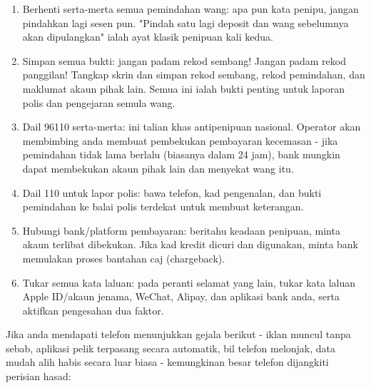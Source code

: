 \begin{enumerate}
  \item Berhenti serta-merta semua pemindahan wang: apa pun kata penipu, jangan pindahkan lagi sesen pun. "Pindah satu lagi deposit dan wang sebelumnya akan dipulangkan" ialah ayat klasik penipuan kali kedua.
  \item Simpan semua bukti: jangan padam rekod sembang! Jangan padam rekod panggilan! Tangkap skrin dan simpan rekod sembang, rekod pemindahan, dan maklumat akaun pihak lain. Semua ini ialah bukti penting untuk laporan polis dan pengejaran semula wang.
  \item Dail 96110 serta-merta: ini talian khas antipenipuan nasional. Operator akan membimbing anda membuat pembekukan pembayaran kecemasan - jika pemindahan tidak lama berlalu (biasanya dalam 24 jam), bank mungkin dapat membekukan akaun pihak lain dan menyekat wang itu.
  \item Dail 110 untuk lapor polis: bawa telefon, kad pengenalan, dan bukti pemindahan ke balai polis terdekat untuk membuat keterangan.
  \item Hubungi bank/platform pembayaran: beritahu keadaan penipuan, minta akaun terlibat dibekukan. Jika kad kredit dicuri dan digunakan, minta bank memulakan proses bantahan caj (chargeback).
  \item Tukar semua kata laluan: pada peranti selamat yang lain, tukar kata laluan Apple ID/akaun jenama, WeChat, Alipay, dan aplikasi bank anda, serta aktifkan pengesahan dua faktor.
\end{enumerate}


Jika anda mendapati telefon menunjukkan gejala berikut - iklan muncul tanpa sebab, aplikasi pelik terpasang secara automatik, bil telefon melonjak, data mudah alih habis secara luar biasa - kemungkinan besar telefon dijangkiti perisian hasad:

